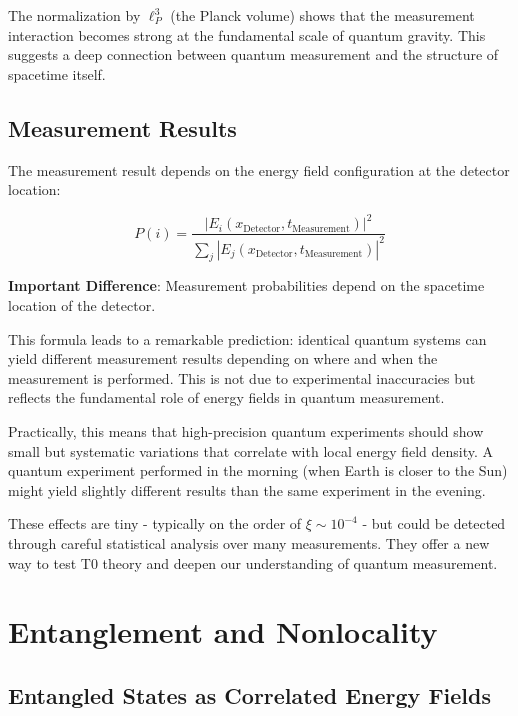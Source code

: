 \documentclass[12pt,a4paper]{article}
\newcommand{\xipar}{\xi}
\theoremstyle{definition}
\theoremstyle{remark}
\begin{document}
	The normalization by $\ell_P^3$ (the Planck volume) shows that the measurement interaction becomes strong at the fundamental scale of quantum gravity. This suggests a deep connection between quantum measurement and the structure of spacetime itself.
	
	\subsection{Measurement Results}
	
	The measurement result depends on the energy field configuration at the detector location:
	
	\begin{equation}
		P(i) = \frac{|E_i(x_{\text{Detector}}, t_{\text{Measurement}})|^2}{\sum_j |E_j(x_{\text{Detector}}, t_{\text{Measurement}})|^2}
		\label{eq:measurement_probability}
	\end{equation}
	
	\textbf{Important Difference}: Measurement probabilities depend on the spacetime location of the detector.
	
	This formula leads to a remarkable prediction: identical quantum systems can yield different measurement results depending on where and when the measurement is performed. This is not due to experimental inaccuracies but reflects the fundamental role of energy fields in quantum measurement.
	
	Practically, this means that high-precision quantum experiments should show small but systematic variations that correlate with local energy field density. A quantum experiment performed in the morning (when Earth is closer to the Sun) might yield slightly different results than the same experiment in the evening.
	
	These effects are tiny - typically on the order of $\xipar \sim 10^{-4}$ - but could be detected through careful statistical analysis over many measurements. They offer a new way to test T0 theory and deepen our understanding of quantum measurement.
	
	\section{Entanglement and Nonlocality}
	
	\subsection{Entangled States as Correlated Energy Fields}
	
\end{document}
